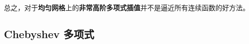 \documentclass[a4paper]{ctexart}
\begin{document}
总之，对于{\bfseries 均匀网格}上的{\bfseries 非常高阶多项式插值}并不是逼近所有连续函数的好方法。

\subsection{Chebyshev 多项式}











\end{document}

